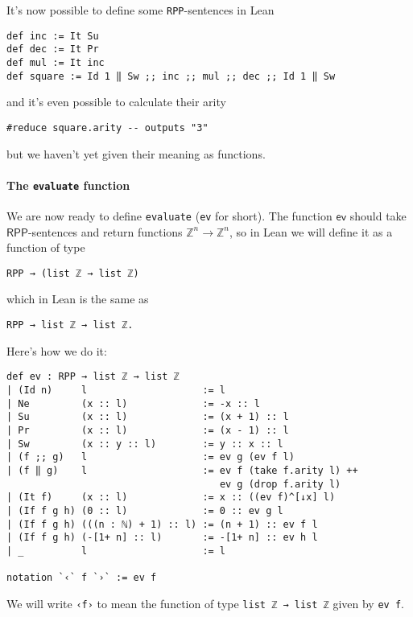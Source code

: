 \documentclass{book}
\theoremstyle{definition}
\theoremstyle{remark}
\theoremstyle{plain}
\newcommand{\Z}{\mathbb{Z}}
\newcommand{\RPP}{\mathsf{RPP}}
\begin{document}
It's now possible to define some \lstinline{RPP}-sentences in Lean
\begin{lstlisting}
def inc := It Su
def dec := It Pr
def mul := It inc
def square := Id 1 ‖ Sw ;; inc ;; mul ;; dec ;; Id 1 ‖ Sw
\end{lstlisting}
and it's even possible to calculate their arity
\begin{lstlisting}
#reduce square.arity -- outputs "3"
\end{lstlisting}
but we haven't yet given their meaning as functions.

\paragraph{The \lstinline{evaluate} function}
We are now ready to define \lstinline{evaluate} (\lstinline{ev} for short).
The function $\mathsf{ev}$ should take $\RPP$-sentences and return functions $\Z^n \to \Z^n$,
so in Lean we will define it as a function of type
\begin{lstlisting}
RPP → (list ℤ → list ℤ)
\end{lstlisting}
which in Lean is the same as
\begin{lstlisting}
RPP → list ℤ → list ℤ.
\end{lstlisting}
Here's how we do it:
\begin{lstlisting}
def ev : RPP → list ℤ → list ℤ
| (Id n)     l                    := l
| Ne         (x :: l)             := -x :: l
| Su         (x :: l)             := (x + 1) :: l
| Pr         (x :: l)             := (x - 1) :: l
| Sw         (x :: y :: l)        := y :: x :: l
| (f ;; g)   l                    := ev g (ev f l)
| (f ‖ g)    l                    := ev f (take f.arity l) ++
                                     ev g (drop f.arity l)
| (It f)     (x :: l)             := x :: ((ev f)^[↓x] l)
| (If f g h) (0 :: l)             := 0 :: ev g l
| (If f g h) (((n : ℕ) + 1) :: l) := (n + 1) :: ev f l
| (If f g h) (-[1+ n] :: l)       := -[1+ n] :: ev h l
| _          l                    := l

notation `‹` f `›` := ev f
\end{lstlisting}
We will write \lstinline{‹f›} to mean the function of type \lstinline{list ℤ → list ℤ} given by \lstinline{ev f}.
\end{document}
